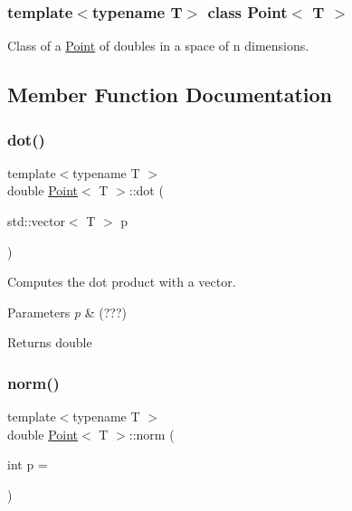 \subsubsection*{template$<$typename T$>$\newline
class Point$<$ T $>$}

Class of a \mbox{\hyperlink{class_point}{Point}} of doubles in a space of n dimensions. 

\subsection{Member Function Documentation}
\mbox{\label{class_point_ab1a74677723b3774be565d88af2187f8}} 
\subsubsection{\texorpdfstring{dot()}{dot()}}
{\footnotesize\ttfamily template$<$typename T $>$ \\
double \mbox{\hyperlink{class_point}{Point}}$<$ T $>$\+::dot (\begin{DoxyParamCaption}\item[{std\+::vector$<$ T $>$}]{p }\end{DoxyParamCaption})}



Computes the dot product with a vector. 


\begin{DoxyParams}{Parameters}
{\em p} & (???) \\
\hline
\end{DoxyParams}
\begin{DoxyReturn}{Returns}
double 
\end{DoxyReturn}
\mbox{\label{class_point_a399e38f00c2bb383ba6291b2318e7207}} 
\subsubsection{\texorpdfstring{norm()}{norm()}}
{\footnotesize\ttfamily template$<$typename T $>$ \\
double \mbox{\hyperlink{class_point}{Point}}$<$ T $>$\+::norm (\begin{DoxyParamCaption}\item[{int}]{p = {} }\end{DoxyParamCaption})}



